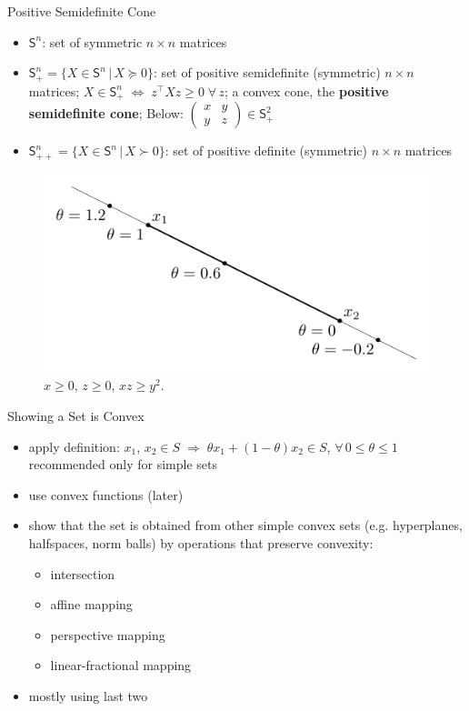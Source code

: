\documentclass[10pt]{beamer}
\newcommand{\ds}{\displaystyle}
\newcommand{\ie}{\;\Longrightarrow\;}
\newcommand{\ifff}{\;\Longleftrightarrow\;}
\theoremstyle{definition}
\begin{document}
\begin{frame}{Positive Semidefinite Cone}
  \begin{itemize}
    \item $\mathsf{S}^n$: set of symmetric $n\times n$ matrices
    \item $\ds\mathsf{S}^n_+ = \{X\in\mathsf{S}^n\,|\,X\succcurlyeq 0\}$: set of positive semidefinite (symmetric) $n\times n$ matrices; $\ds X\in\mathsf{S}^n_+ \ifff z^\top X z\geqslant 0\;\forall\,z$; a convex cone, the {\bf positive semidefinite cone}; Below: $\ds\begin{pmatrix}x & y \\ y & z\end{pmatrix}\in\mathsf{S}^2_+$
    \item $\ds\mathsf{S}^n_{++} = \{X\in\mathsf{S}^n\,|\,X\succ 0\}$: set of positive definite (symmetric) $n\times n$ matrices
  \end{itemize}
  \begin{figure}[!htbp]
    \centering
    \includegraphics[scale=0.6,page=12]{fig/note06/02.pdf}
    \caption{$x\geqslant 0$, $z\geqslant 0$, $xz\geqslant y^2$.}
  \end{figure}
\end{frame}

\begin{frame}{Showing a Set is Convex}
  \begin{itemize}
    \item apply definition: $x_1$, $x_2\in S\ie \theta x_1 + (1 - \theta)x_2\in S$, $\forall\,0\leqslant\theta\leqslant 1$ \\ recommended only for simple sets
    \item use convex functions (later)
    \item show that the set is obtained from other simple convex sets (e.g. hyperplanes, halfspaces, norm balls) by operations that preserve convexity:
      \begin{itemize}
        \item intersection
        \item affine mapping
        \item perspective mapping
        \item linear-fractional mapping
      \end{itemize}
    \item mostly using last two
  \end{itemize}
\end{frame}
\end{document}
